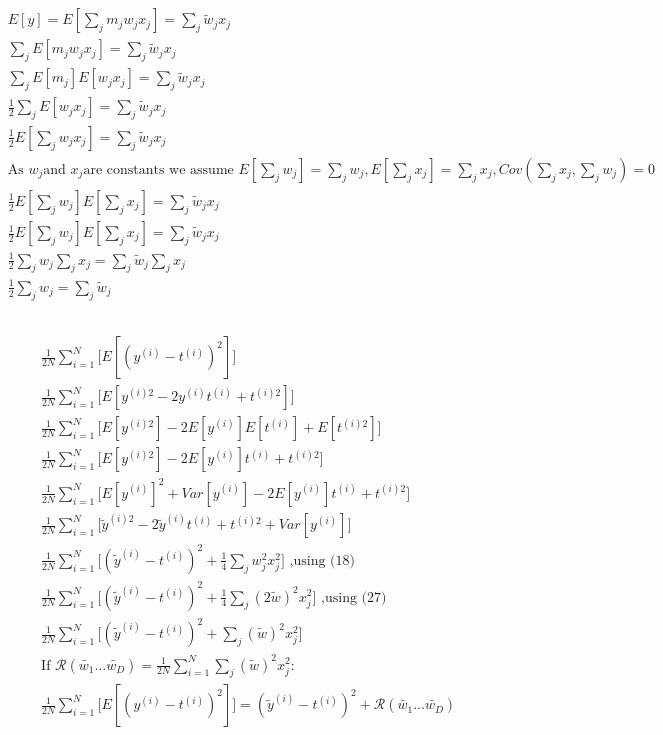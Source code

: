 \documentclass[12pt,letterpaper]{article} %
\newcommand{\sumj}{\sum_j}
\begin{document}
\subsection{}
\begin{align}
&E[y] = E[\sum_j m_jw_jx_j]= \sumj \tilde{w}_jx_j \\
&\sumj E[m_jw_jx_j]= \sumj \tilde{w}_jx_j \\
&\sumj E[m_j]E[w_jx_j]= \sumj \tilde{w}_jx_j \\
&\frac{1}{2}\sumj E[w_jx_j]= \sumj \tilde{w}_jx_j \\
&\frac{1}{2}E[\sumj w_jx_j]= \sumj \tilde{w}_jx_j \\
&\text{As } w_j \text{and } x_j \text{are constants we assume }E[\sumj w_j]=\sumj w_j, E[\sumj x_j]=\sumj x_j, Cov(\sumj x_j,\sumj w_j) = 0\\
&\frac{1}{2}E[\sumj w_j]E[\sumj x_j]= \sumj \tilde{w}_jx_j \\
&\frac{1}{2}E[\sumj w_j]E[\sumj x_j]= \sumj \tilde{w}_jx_j \\
&\frac{1}{2}\sumj w_j\sumj x_j = \sumj \tilde{w}_j \sumj x_j \\
&\frac{1}{2}\sumj w_j = \sumj\tilde{w}_j
\end{align}
\subsection{}
\begin{align}
&\frac{1}{2N}\sum_{i=1}^N\big[E[(y^{(i)}-t^{(i)})^2] \big]\\
&\frac{1}{2N}\sum_{i=1}^N\big[E[y^{(i)2}-2y^{(i)}t^{(i)} + t^{(i)2}] \big]\\
&\frac{1}{2N}\sum_{i=1}^N\big[E[y^{(i) 2}]-2E[y^{(i)}]E[t^{(i)}]+ E[t^{(i) 2}] \big]\\
&\frac{1}{2N}\sum_{i=1}^N\big[E[y^{(i) 2}]-2E[y^{(i)}]t^{(i)}+ t^{(i) 2} \big]\\
&\frac{1}{2N}\sum_{i=1}^N\big[E[y^{(i)}]^ 2+Var[y^{(i)}]-2E[y^{(i)}]t^{(i)}+ t^{(i) 2} \big]\\
&\frac{1}{2N}\sum_{i=1}^N\big[\tilde{y}^{(i) 2}-2\tilde{y}^{(i)}t^{(i)}+ t^{(i) 2} +Var[y^{(i)}] \big]\\
&\frac{1}{2N}\sum_{i=1}^N\big[(\tilde{y}^{(i)}-t^{(i)})^2 + \frac{1}{4}\sumj w_j^2x_j^2 \big] \text{  ,using (18)}\\
&\frac{1}{2N}\sum_{i=1}^N\big[(\tilde{y}^{(i)}-t^{(i)})^2 + \frac{1}{4}\sumj (2\tilde{w})^2x_j^2 \big]\text{  ,using (27)} \\
&\frac{1}{2N}\sum_{i=1}^N\big[(\tilde{y}^{(i)}-t^{(i)})^2 + \sumj (\tilde{w})^2x_j^2 \big] \\
&\text{If }\mathcal{R}(\tilde{w_1}...\tilde{w_D}) =\frac{1}{2N}\sum_{i=1}^N \sumj (\tilde{w})^2x_j^2:\\
&\frac{1}{2N}\sum_{i=1}^N\big[E[(y^{(i)}-t^{(i)})^2] \big] = (\tilde{y}^{(i)}-t^{(i)})^2 + \mathcal{R}(\tilde{w_1}...\tilde{w_D}) \\
\end{align}
\end{document}
